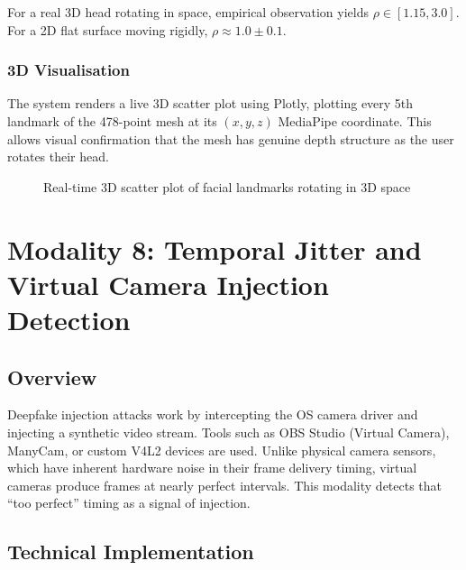 \documentclass[12pt,a4paper]{report}
\begin{document}
For a real 3D head rotating in space, empirical observation yields $\rho \in [1.15, 3.0]$.
For a 2D flat surface moving rigidly, $\rho \approx 1.0 \pm 0.1$.

\subsection{3D Visualisation}
The system renders a live 3D scatter plot using Plotly, plotting every 5th landmark of the 478-point mesh at its $(x, y, z)$ MediaPipe coordinate. This allows visual confirmation that the mesh has genuine depth structure as the user rotates their head.

\begin{figure}[H]
    \centering
    \caption{Real-time 3D scatter plot of facial landmarks rotating in 3D space}
    \label{fig:mesh3d}
\end{figure}

\chapter{Modality 8: Temporal Jitter and Virtual Camera Injection Detection}

\section{Overview}
Deepfake injection attacks work by intercepting the OS camera driver and injecting a synthetic video stream. Tools such as OBS Studio (Virtual Camera), ManyCam, or custom V4L2 devices are used. Unlike physical camera sensors, which have inherent hardware noise in their frame delivery timing, virtual cameras produce frames at nearly perfect intervals. This modality detects that ``too perfect'' timing as a signal of injection.

\section{Technical Implementation}
\end{document}
